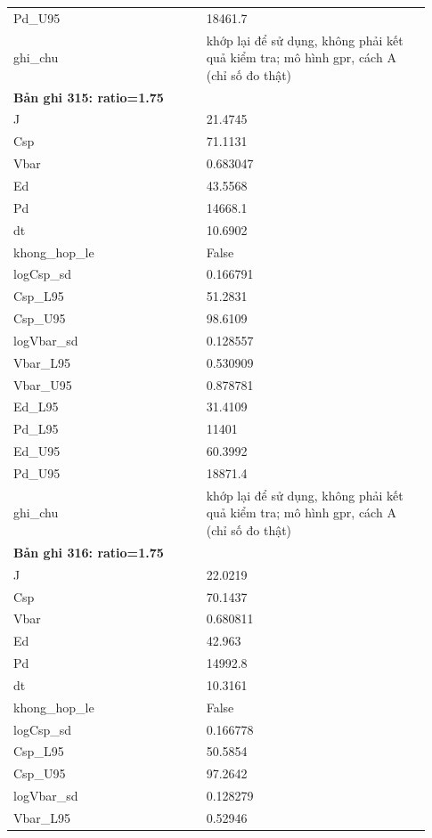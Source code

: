 \begin{longtable}{p{0.43\linewidth}p{0.50\linewidth}}
Pd\_\allowbreak U95 & 18461.7 \\
ghi\_\allowbreak chu & khớp lại để sử dụng, không phải kết quả kiểm tra; mô hình gpr, cách A (chỉ số đo thật) \\
\midrule
\multicolumn{2}{p{0.95\linewidth}}{\textbf{Bản ghi 315: ratio=1.75}} \\
J & 21.4745 \\
Csp & 71.1131 \\
Vbar & 0.683047 \\
Ed & 43.5568 \\
Pd & 14668.1 \\
dt & 10.6902 \\
khong\_\allowbreak hop\_\allowbreak le & False \\
logCsp\_\allowbreak sd & 0.166791 \\
Csp\_\allowbreak L95 & 51.2831 \\
Csp\_\allowbreak U95 & 98.6109 \\
logVbar\_\allowbreak sd & 0.128557 \\
Vbar\_\allowbreak L95 & 0.530909 \\
Vbar\_\allowbreak U95 & 0.878781 \\
Ed\_\allowbreak L95 & 31.4109 \\
Pd\_\allowbreak L95 & 11401 \\
Ed\_\allowbreak U95 & 60.3992 \\
Pd\_\allowbreak U95 & 18871.4 \\
ghi\_\allowbreak chu & khớp lại để sử dụng, không phải kết quả kiểm tra; mô hình gpr, cách A (chỉ số đo thật) \\
\midrule
\multicolumn{2}{p{0.95\linewidth}}{\textbf{Bản ghi 316: ratio=1.75}} \\
J & 22.0219 \\
Csp & 70.1437 \\
Vbar & 0.680811 \\
Ed & 42.963 \\
Pd & 14992.8 \\
dt & 10.3161 \\
khong\_\allowbreak hop\_\allowbreak le & False \\
logCsp\_\allowbreak sd & 0.166778 \\
Csp\_\allowbreak L95 & 50.5854 \\
Csp\_\allowbreak U95 & 97.2642 \\
logVbar\_\allowbreak sd & 0.128279 \\
Vbar\_\allowbreak L95 & 0.52946 \\

\end{longtable}
